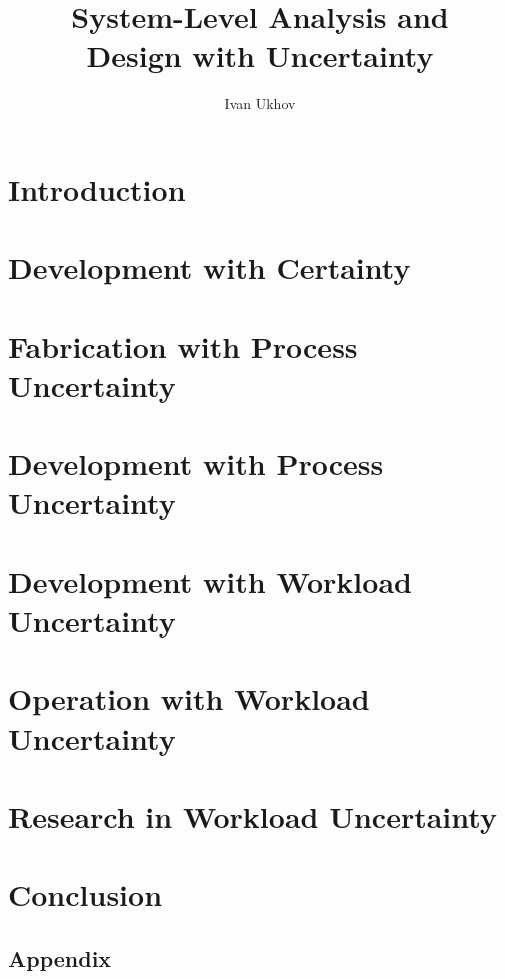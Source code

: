 \documentclass{thesis}
\title{
  System-Level Analysis and\\[0.3em]
  Design with Uncertainty
}
\author{Ivan Ukhov}
\begin{document}
\nocite{ukhov2012, ukhov2014a, ukhov2014b, ukhov2015, ukhov2017a, ukhov2017b}

\chapter{Introduction}
\newcommand{\inputsection}[1]{}


\chapter{Development with Certainty}
\renewcommand{\inputsection}[1]{}


\chapter{Fabrication with Process Uncertainty}
\renewcommand{\inputsection}[1]{}


\chapter{Development with Process Uncertainty}
\renewcommand{\inputsection}[1]{}


\chapter{Development with Workload Uncertainty}
\renewcommand{\inputsection}[1]{}


\chapter{Operation with Workload Uncertainty}
\renewcommand{\inputsection}[1]{}


\chapter{Research in Workload Uncertainty}
\renewcommand{\inputsection}[1]{}


\chapter{Conclusion}


\begin{appendices}
\chapter{Appendix}
\renewcommand{\inputsection}[1]{}

\end{appendices}

\printbibliography
\end{document}
